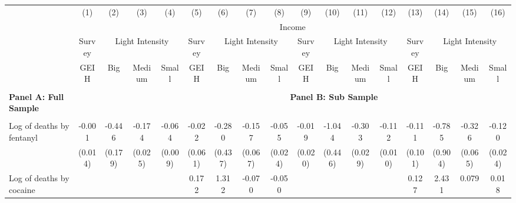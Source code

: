 \begin{tabular}{lcccccccccccccccc} \\ \hline 
                    &\multicolumn{1}{c}{(1)}         &\multicolumn{1}{c}{(2)}         &\multicolumn{1}{c}{(3)}         &\multicolumn{1}{c}{(4)}         &\multicolumn{1}{c}{(5)}         &\multicolumn{1}{c}{(6)}         &\multicolumn{1}{c}{(7)}         &\multicolumn{1}{c}{(8)}         &\multicolumn{1}{c}{(9)}         &\multicolumn{1}{c}{(10)}         &\multicolumn{1}{c}{(11)}         &\multicolumn{1}{c}{(12)}         &\multicolumn{1}{c}{(13)}         &\multicolumn{1}{c}{(14)}         &\multicolumn{1}{c}{(15)}         &\multicolumn{1}{c}{(16)}         \\
 & \multicolumn{16}{c}{Income} \\ \cline{2-5} \cline{6-9} \cline{10-13} \cline{14-17}  & Survey  &  \multicolumn{3}{c}{Light Intensity} & Survey & \multicolumn{3}{c}{Light Intensity} & Survey  &  \multicolumn{3}{c}{Light Intensity} & Survey & \multicolumn{3}{c}{Light Intensity} \\ \cline{3-5} \cline{7-9} \cline{11-13} \cline{15-17} & GEIH & Big & Medium & Small & GEIH & Big & Medium & Small & GEIH & Big & Medium & Small & GEIH & Big & Medium & Small \\ \hline & & & & & & & & & & & & & &  &  &  &  \\ \textbf{Panel A: Full Sample}& & & & & & & &  \multicolumn{5}{c}{\textbf{Panel B: Sub Sample}}  \\ & & & & & & & & & & & &  & & \\
Log of deaths by fentanyl&      -0.001         &      -0.446\sym{**} &      -0.174\sym{***}&      -0.064\sym{***}&      -0.022         &      -0.280         &      -0.157\sym{*}  &      -0.055\sym{*}  &      -0.019         &      -1.044\sym{*}  &      -0.303\sym{***}&      -0.112\sym{***}&      -0.111         &      -0.785         &      -0.326\sym{***}&      -0.120\sym{***}\\
                    &     (0.014)         &     (0.179)         &     (0.025)         &     (0.009)         &     (0.061)         &     (0.437)         &     (0.067)         &     (0.024)         &     (0.020)         &     (0.446)         &     (0.029)         &     (0.010)         &     (0.101)         &     (0.904)         &     (0.065)         &     (0.024)         \\
\addlinespace
Log of deaths by cocaine&                     &                     &                     &                     &       0.172         &       1.312         &      -0.070         &      -0.050         &                     &                     &                     &                     &       0.127         &       2.431\sym{*}  &       0.079         &       0.018         \\

\end{tabular}

